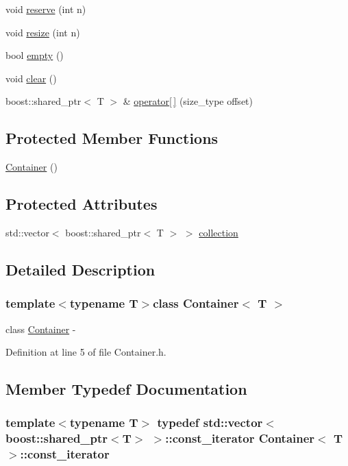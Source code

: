 \begin{DoxyCompactItemize}
\item 
void \hyperlink{class_container_aa3cbae68ebeed649c52eb3805a30fb75}{reserve} (int n)
\item 
void \hyperlink{class_container_ab77ce6f8173bd47c4cf46643317dffdb}{resize} (int n)
\item 
bool \hyperlink{class_container_ab8e09c25f519687468ef5b9f0fae9b3e}{empty} ()
\item 
void \hyperlink{class_container_aab0690d44c8e04614cea46935ff49e7a}{clear} ()
\item 
boost::shared\_\-ptr$<$ T $>$ \& \hyperlink{class_container_aed3c227120a6a745fa9adfb25c3dd225}{operator\mbox{[}$\,$\mbox{]}} (size\_\-type offset)
\end{DoxyCompactItemize}
\subsection*{Protected Member Functions}
\begin{DoxyCompactItemize}
\item 
\hyperlink{class_container_ab17ce1f67243b28abcd4c8113a72524c}{Container} ()
\end{DoxyCompactItemize}
\subsection*{Protected Attributes}
\begin{DoxyCompactItemize}
\item 
std::vector$<$ boost::shared\_\-ptr$<$ T $>$ $>$ \hyperlink{class_container_a6cc12233bceb7d72709320d2c57e3398}{collection}
\end{DoxyCompactItemize}


\subsection{Detailed Description}
\subsubsection*{template$<$typename T$>$class Container$<$ T $>$}

class \hyperlink{class_container}{Container} -\/ 

Definition at line 5 of file Container.h.



\subsection{Member Typedef Documentation}
\hypertarget{class_container_a5eabadaffdd508cb623c955eb0af1518}{
\subsubsection[{const\_\-iterator}]{\setlength{\rightskip}{0pt plus 5cm}template$<$typename T$>$ typedef std::vector$<$boost::shared\_\-ptr$<$T$>$ $>$::{\bf const\_\-iterator} {\bf Container}$<$ T $>$::{\bf const\_\-iterator}}}
\label{class_container_a5eabadaffdd508cb623c955eb0af1518}


